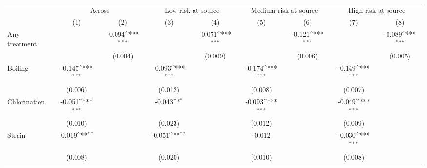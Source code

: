 {
\def\sym#1{\ifmmode^{#1}\else\(^{#1}\)\fi}
\begin{tabular}{l*{8}{c}}
\hline\hline
                    &\multicolumn{2}{c}{Across}                 &\multicolumn{2}{c}{Low risk at source}     &\multicolumn{2}{c}{Medium risk at source}  &\multicolumn{2}{c}{High risk at source}    \\\cmidrule(lr){2-3}\cmidrule(lr){4-5}\cmidrule(lr){6-7}\cmidrule(lr){8-9}
                    &\multicolumn{1}{c}{(1)}         &\multicolumn{1}{c}{(2)}         &\multicolumn{1}{c}{(3)}         &\multicolumn{1}{c}{(4)}         &\multicolumn{1}{c}{(5)}         &\multicolumn{1}{c}{(6)}         &\multicolumn{1}{c}{(7)}         &\multicolumn{1}{c}{(8)}         \\
\hline
Any treatment &                     &      -0.094\sym{***}&                     &      -0.071\sym{***}&                     &      -0.121\sym{***}&                     &      -0.089\sym{***}\\
                    &                     &     (0.004)         &                     &     (0.009)         &                     &     (0.006)         &                     &     (0.005)         \\
Boiling             &      -0.145\sym{***}&                     &      -0.093\sym{***}&                     &      -0.174\sym{***}&                     &      -0.149\sym{***}&                     \\
                    &     (0.006)         &                     &     (0.012)         &                     &     (0.008)         &                     &     (0.007)         &                     \\
Chlorination        &      -0.051\sym{***}&                     &      -0.043\sym{*}  &                     &      -0.093\sym{***}&                     &      -0.049\sym{***}&                     \\
                    &     (0.010)         &                     &     (0.023)         &                     &     (0.012)         &                     &     (0.009)         &                     \\
Strain              &      -0.019\sym{**} &                     &      -0.051\sym{**} &                     &      -0.012         &                     &      -0.030\sym{***}&                     \\
                    &     (0.008)         &                     &     (0.020)         &                     &     (0.010)         &                     &     (0.008)         &                     \\

\end{tabular}}
